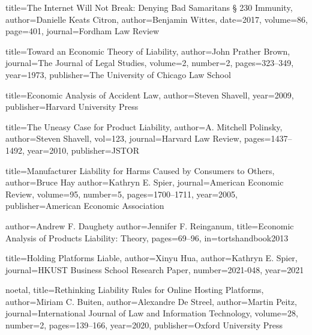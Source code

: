 
{
title={The Internet Will Not Break: Denying Bad Samaritans § 230 Immunity},
author={Danielle Keats Citron},
author={Benjamin Wittes},
date={2017},
volume=86,
page=401,
journal=Fordham Law Review
}




{
  title={Toward an Economic Theory of Liability},
  author={John Prather Brown},
  journal={The Journal of Legal Studies},
  volume={2},
  number={2},
  pages={323--349},
  year={1973},
  publisher={The University of Chicago Law School}
}



{
  title={Economic Analysis of Accident Law},
  author={Steven Shavell},
  year={2009},
  publisher={Harvard University Press}
}


{
  title={The Uneasy Case for Product Liability},
  author={A. Mitchell Polinsky}, 
  author={Steven Shavell},
  vol={123},
  journal={Harvard Law Review},
  pages={1437--1492},
  year={2010},
  publisher={JSTOR}
}

{
  title={Manufacturer Liability for Harms Caused by Consumers to Others},
  author={Bruce Hay}
  author={Kathryn E. Spier},
  journal={American Economic Review},
  volume={95},
  number={5},
  pages={1700--1711},
  year={2005},
  publisher={American Economic Association}
}


{
  author={Andrew F. Daughety}
  author={Jennifer F. Reinganum},
  title={Economic Analysis of Products Liability: Theory},
  pages={69--96},
  in={tortshandbook2013}
}


{
  title={Holding Platforms Liable},
  author={Xinyu Hua},
  author={Kathryn E. Spier},
  journal={HKUST Business School Research Paper},
  number={2021-048},
  year={2021}
}

{ noetal,
  title={Rethinking Liability Rules for Online Hosting Platforms},
  author={Miriam C. Buiten},
  author={Alexandre De Streel},
  author={Martin Peitz},
  journal={International Journal of Law and Information Technology},
  volume={28},
  number={2},
  pages={139--166},
  year={2020},
  publisher={Oxford University Press}
}

